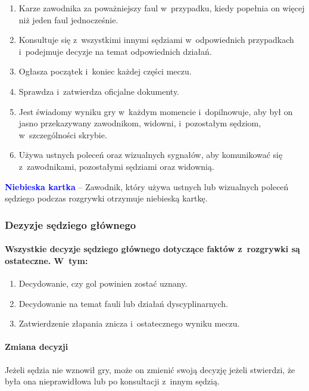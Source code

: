 \documentclass[12pt]{article}
\newcommand\bluecard[1]{\bgroup\textcolor{blue}{\textbf{#1}}}
\begin{document}
\begin{enumerate}
	\item Karze zawodnika za poważniejszy faul w~przypadku, kiedy popełnia on
	      więcej niż jeden faul jednocześnie.

	\item Konsultuje się z~wszystkimi innymi sędziami w~odpowiednich
	      przypadkach i~podejmuje decyzje na temat odpowiednich działań.

	\item Ogłasza początek i~koniec każdej części meczu.

	\item Sprawdza i~zatwierdza oficjalne dokumenty.

	\item Jest świadomy wyniku gry w~każdym momencie i~dopilnowuje, aby był on
	      jasno przekazywany zawodnikom, widowni, i~pozostałym sędziom, w~szczególności skrybie.

	\item Używa ustnych poleceń oraz wizualnych sygnałów, aby komunikować się z~zawodnikami, pozostałymi sędziami oraz widownią.
\end{enumerate}

\bluecard{Niebieska kartka} -- Zawodnik, który używa ustnych lub wizualnych
poleceń sędziego podczas rozgrywki otrzymuje niebieską kartkę.

\subsubsection{Dezyzje sędziego głównego}

\paragraph{Wszystkie decyzje sędziego głównego dotyczące faktów z~rozgrywki są ostateczne. W~tym:}
\begin{enumerate}
	\item Decydowanie, czy gol powinien zostać uznany.

	\item Decydowanie na temat fauli lub działań dyscyplinarnych.

	\item Zatwierdzenie złapania znicza i~ostatecznego wyniku meczu.
\end{enumerate}

\paragraph{Zmiana decyzji}
Jeżeli sędzia nie wznowił gry, może
on zmienić swoją decyzję jeżeli stwierdzi, że była ona nieprawidłowa lub
po konsultacji z~innym sędzią.
\end{document}

